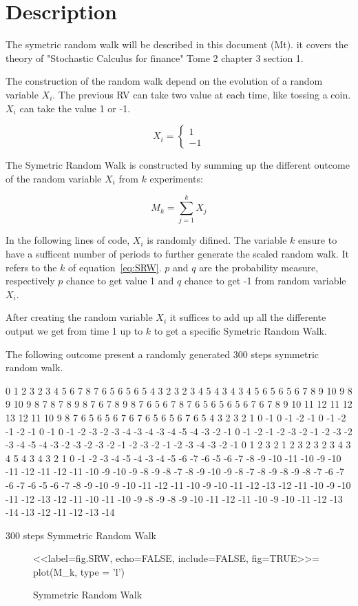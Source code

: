 \documentclass{article}
\begin{document}


\section{Description}
The symetric random walk will be described in this document (Mt). it covers the theory of "Stochastic Calculus for finance" Tome 2 chapter 3 section 1.

The construction of the random walk depend on the evolution of a random variable $X_i$. The previous RV can take two value at each time, like tossing a coin. $X_i$ can take the value 1 or -1.

\begin{equation}
 \label{eq:Xi}
X_i = 
\left \{{
  \begin{array}{c} 1 \\ -1 \end{array}
  }\right .
\end{equation}
 
The Symetric Random Walk is constructed by summing up the different outcome of the random variable $X_i$ from $k$ experiments:

\begin{equation}
\label{eq:SRW}
M_k = 
\sum_{j=1}^k X_j
\end{equation}

In the following lines of code, $X_i$ is randomly difined. The variable $k$ ensure to have a sufficent number of periods to further generate the scaled random walk.
It refers to the $k$ of equation~\ref{eq:SRW}.
$p$ and $q$ are the probability measure, respectively $p$ chance to get value 1 and $q$ chance to get -1 from random variable $X_i$.




After creating the random variable $X_i$ it suffices to add up all the differente output we get from time 1 up to $k$ to get a specific Symetric Random Walk.

The following outcome present a randomly generated 300 steps symmetric random walk.

\begin{table}[h]
0 1 2 3 2 3 4 5 6 7 8 7 6 5 6 5 6 5 4 3 2 3 2 3 4 5 4 3 4 3 4 5 6 5 6 5 6 7 8 9 10 9 8 9 10 9 8 7 8 7 8 9 8 7 6 7 8 9 8 7 6 5 6 7 8 7 6 5 6 5 6 5 6 7 6 7 8 9 10 11 12 11 12 13 12 11 10 9 8 7 6 5 6 5 6 7 6 7 6 5 6 5 6 7 6 5 4 3 2 3 2 1 0 -1 0 -1 -2 -1 0 -1 -2 -1 -2 -1 0 -1 0 -1 -2 -3 -2 -3 -4 -3 -4 -3 -4 -5 -4 -3 -2 -1 0 -1 -2 -1 -2 -3 -2 -1 -2 -3 -2 -3 -4 -5 -4 -3 -2 -3 -2 -3 -2 -1 -2 -3 -2 -1 -2 -3 -4 -3 -2 -1 0 1 2 3 2 1 2 3 2 3 2 3 4 3 4 5 4 3 4 3 2 1 0 -1 -2 -3 -4 -5 -4 -3 -4 -5 -6 -7 -6 -5 -6 -7 -8 -9 -10 -11 -10 -9 -10 -11 -12 -11 -12 -11 -10 -9 -10 -9 -8 -9 -8 -7 -8 -9 -10 -9 -8 -7 -8 -9 -8 -9 -8 -7 -6 -7 -6 -7 -6 -5 -6 -7 -8 -9 -10 -9 -10 -11 -12 -11 -10 -9 -10 -11 -12 -13 -12 -11 -10 -9 -10 -11 -12 -13 -12 -11 -10 -11 -10 -9 -8 -9 -8 -9 -10 -11 -12 -11 -10 -9 -10 -11 -12 -13 -14 -13 -12 -11 -12 -13 -14\caption{300 steps Symmetric Random Walk}
\end{table}




\begin{figure}[!h]
\begin{center}

 <<label=fig.SRW, echo=FALSE, include=FALSE, fig=TRUE>>=
plot(M_k,
    type = 'l')

\end{center}
\caption{Symmetric Random Walk}
\end{figure}
\end{document}
